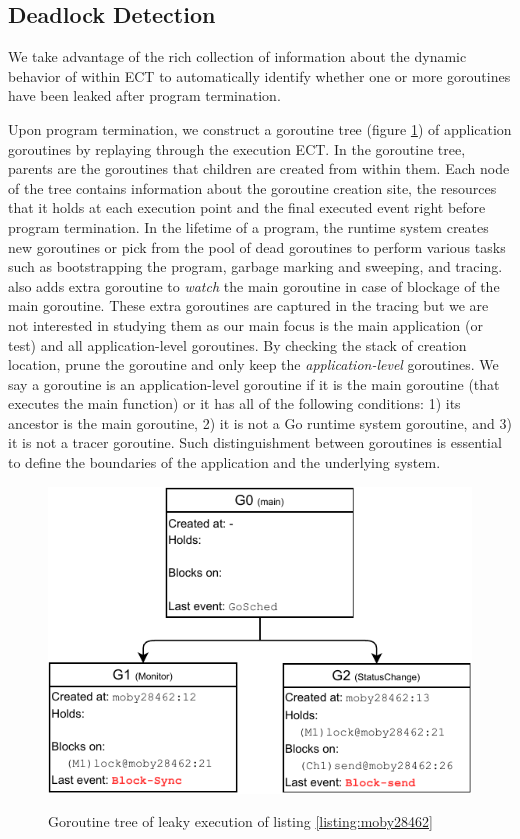 \subsection{Deadlock Detection}
\label{sec:dld}
We take advantage of the rich collection of information about the dynamic behavior of within ECT to automatically identify whether one or more goroutines have been leaked after program termination.

Upon program termination, we construct a goroutine tree (figure \ref{fig:gtree}) of application goroutines by replaying through the execution ECT.
%
In the goroutine tree, parents are the goroutines that children are created from within them. Each node of the tree contains information about the goroutine creation site, the resources that it holds at each execution point and the final executed event right before program termination.
%
In the lifetime of a program, the runtime system creates new goroutines or pick from the pool of dead goroutines to perform various tasks such as bootstrapping the program, garbage marking and sweeping, and tracing.
%
\goat also adds extra goroutine to \textit{watch} the main goroutine in case of blockage of the main goroutine.
%
These extra goroutines are captured in the tracing but we are not interested in studying them as our main focus is the main application (or test) and all application-level goroutines.
%
By checking the stack of creation location, \goat prune the goroutine and only keep the \textit{application-level} goroutines.
%
We say a goroutine is an application-level goroutine if it is the main goroutine (that executes the main function) or it has all of the following conditions:
1) its ancestor is the main goroutine,
2) it is not a Go runtime system goroutine, and
3) it is not a tracer goroutine.
Such distinguishment between goroutines is essential to define the boundaries of the application and the underlying system.



\begin{figure}[]

\includegraphics[width=0.9\linewidth]{figs/gtree.pdf}
\label{fig:gtree}
\caption{Goroutine tree of leaky execution of listing \ref{listing:moby28462}}
\end{figure}

